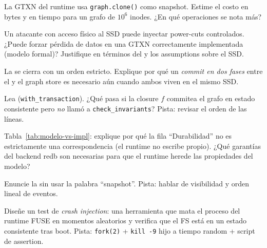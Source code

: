 \begin{ejercicio}[\dificultad{$\star\star$}]
\label{ej:tx-4}
La GTXN del runtime usa \texttt{graph.clone()} como snapshot. Estime el
costo en bytes y en tiempo para un grafo de \(10^6\) inodes. ¿En qué
operaciones se nota más?
\end{ejercicio}

\begin{ejercicio}[\dificultad{$\star\star$}]
\label{ej:tx-5}
Un atacante con acceso físico al SSD puede inyectar power-cuts
controlados. ¿Puede forzar pérdida de datos en una GTXN correctamente
implementada (modelo formal)? Justifique en términos del
 y los assumptions sobre el SSD.
\end{ejercicio}

\begin{ejercicio}[\dificultad{$\star\star$}]
\label{ej:tx-6}
La  se cierra con un orden estricto.
Explique por qué un \emph{commit en dos fases} entre el \wal{} y el
graph store es necesario aún cuando ambos viven en el mismo SSD.
\end{ejercicio}

\begin{ejercicio}[\dificultad{$\star\star$}]
\label{ej:tx-7}
Lea  (\texttt{with\_transaction}).
¿Qué pasa si la closure $f$ commitea el grafo en estado consistente pero
\emph{no} llamó a \texttt{check\_invariants}? Pista: revisar el orden de
las líneas.
\end{ejercicio}

\begin{ejercicio}[\dificultad{$\star\star$}]
\label{ej:tx-8}
Tabla~\ref{tab:modelo-vs-impl}: explique por qué la fila ``Durabilidad''
no es estrictamente una correspondencia (el runtime no escribe \wal{}
propio). ¿Qué garantías del backend redb son necesarias para que el
runtime herede las propiedades del modelo?
\end{ejercicio}

\begin{ejercicio}[\dificultad{$\star\star$}]
\label{ej:tx-9}
Enuncie la  sin usar la palabra ``snapshot''.
Pista: hablar de visibilidad y orden lineal de eventos.
\end{ejercicio}

\begin{ejercicio}[\dificultad{$\star\star\star$}]
\label{ej:tx-10}
Diseñe un test de \emph{crash injection}: una herramienta que mata el
proceso del runtime FUSE en momentos aleatorios y verifica que el FS está
en un estado consistente tras boot. Pista: \texttt{fork(2)} + \texttt{kill -9}
hijo a tiempo random + script de assertion.
\end{ejercicio}

